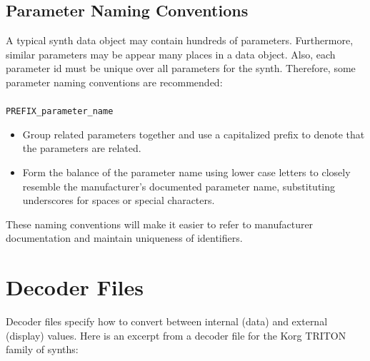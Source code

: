 \documentclass[a4paper,twoside,12pt]{article}
\newcommand{\code}[1]{\color{red}\texttt{#1}\color{black}}
\begin{document}
\subsection{Parameter Naming Conventions}
A typical synth data object may contain hundreds of parameters.
Furthermore, similar parameters may be appear many places in a
data object. Also, each parameter id must be unique over all
parameters for the synth. Therefore, some parameter naming
conventions are recommended: \\
\\
\code{PREFIX\_parameter\_name}
\begin{itemize}
\item Group related parameters together and use a capitalized
prefix to denote that the parameters are related.

\item Form the balance of the parameter name using lower case
letters to closely resemble the manufacturer's documented
parameter name, substituting underscores for spaces or special
characters.
\end{itemize}

These naming conventions will make it easier to refer to
manufacturer documentation and maintain uniqueness of identifiers.

\section{Decoder Files}\label{decoder_files}

Decoder files specify how to convert between internal (data) and
external (display) values. Here is an excerpt from a decoder file
for the Korg TRITON family of synths:
\end{document}

